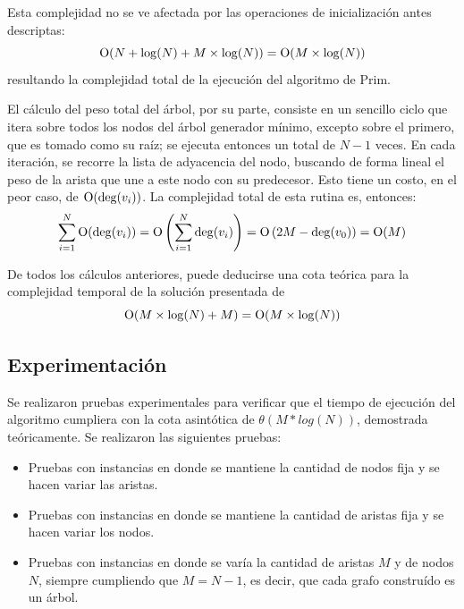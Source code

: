     Esta complejidad no se ve afectada por las operaciones de inicialización
    antes descriptas:
    \[ \operatorname{O}(N + \log(N) + M \times \log(N)) = \operatorname{O}(M \times \log(N)) \]
    resultando la complejidad total de la ejecución del algoritmo de Prim.

    \vspace{1.25em}

    El cálculo del peso total del árbol, por su parte, consiste en un
    sencillo ciclo que itera sobre todos los nodos del árbol generador
    mínimo, excepto sobre el primero, que es tomado como su raíz; se ejecuta
    entonces un total de $N - 1$ veces. En cada iteración, se recorre la
    lista de adyacencia del nodo, buscando de forma lineal el peso de la
    arista que une a este nodo con su predecesor. Esto tiene un costo, en el
    peor caso, de $\operatorname{O}(\operatorname{deg}(v_i))$. La complejidad total de
    esta rutina es, entonces:
    \[ \sum_{i=1}^{N} \operatorname{O}(\operatorname{deg}(v_i)) =
                \operatorname{O} \left( \sum_{i=1}^{N} \operatorname{deg}(v_i) \right) =
                \operatorname{O} \left( 2M - \operatorname{deg}(v_0) \right) = \operatorname{O}(M) \]

    \vspace{1.25em}

    De todos los cálculos anteriores, puede deducirse una cota teórica para
    la complejidad temporal de la solución presentada de
    \[ \operatorname{O}(M \times \log(N) + M) = \operatorname{O}(M \times \log(N)) \]

    \subsection{Experimentación}

    Se realizaron pruebas experimentales para verificar que el tiempo de ejecución del algoritmo cumpliera con la cota asintótica de $\theta(M * log(N))$, demostrada teóricamente. Se realizaron las siguientes pruebas:   

    \begin{itemize}
    \item Pruebas con instancias en donde se mantiene la cantidad de nodos fija y se hacen variar las aristas.
    \item Pruebas con instancias en donde se mantiene la cantidad de aristas fija y se hacen variar los nodos.
    \item Pruebas con instancias en donde se varía la cantidad de aristas $M$ y de nodos $N$, siempre cumpliendo que $M = N  - 1$, es decir, que cada grafo construído es un árbol.
    \end{itemize}

